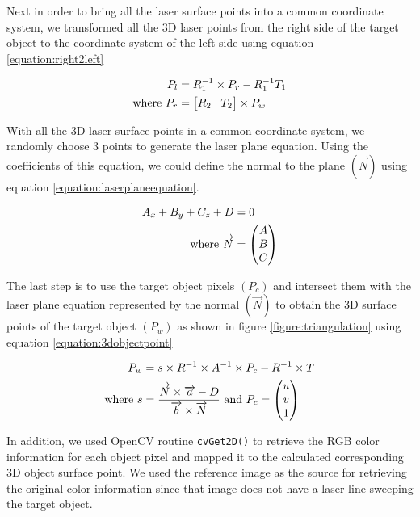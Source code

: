 Next in order to bring all the laser surface points into a common coordinate system, we transformed all the 3D laser points from the right side of the target object to the coordinate system of the left side using equation \ref{equation:right2left}

\begin{align}
	\label{equation:right2left}				
	P_{l} &= R_1^{-1} \times P_{r} - R_1^{-1}T_1 \\
	\text{where}~ 
	P_{r} &= \begin{bmatrix}
									R_2 \mid T_2
 				  \end{bmatrix} \times P_w \notag
\end{align}

With all the 3D laser surface points in a common coordinate system, we randomly choose 3 points to generate the laser plane equation. Using the coefficients of this equation, we could define the normal to the plane $(\overrightarrow{N})$ using equation \ref{equation:laserplaneequation}.

\begin{align}
	\label{equation:laserplaneequation}				
	A_x + B_y + C_z + D &= 0 \\
	\text{where}~
	 \overrightarrow{N} &=
	 \begin{pmatrix}
	  A \\
	  B \\
	  C \\
	 \end{pmatrix} \notag
\end{align}

The last step is to use the target object pixels $(P_c)$ and intersect them with the laser plane equation represented by the normal $(\overrightarrow{N})$ to obtain the 3D surface points of the target object $(P_w)$ as shown in figure \ref{figure:triangulation} using equation \ref{equation:3dobjectpoint}

\begin{align}
	\label{equation:3dobjectpoint}				
	P_w &= s \times R^{-1} 
 					 \times A^{-1} 
					 \times P_c
					- R^{-1} \times T \\
	\text{where}~	
	s &= \frac{\overrightarrow{N}\times\overrightarrow{a} - D}
						{\overrightarrow{b}\times\overrightarrow{N}}
  ~\text{and}~ P_c = \begin{pmatrix}
												u \\
												v \\
												1 \\
										 \end{pmatrix} \notag
\end{align}				

In addition, we used OpenCV routine \texttt{cvGet2D()} to retrieve the RGB color information for each object pixel and mapped it to the calculated corresponding 3D object surface point. We used the reference image as the source for retrieving the original color information since that image does not have a laser line sweeping the target object.